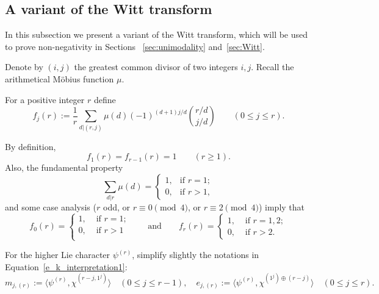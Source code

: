 \subsection{A variant of the Witt transform}
\label{sec:Witt-subsec}
 
In this subsection we present a variant of the Witt transform, which will be used to prove non-negativity in Sections ~\ref{sec:unimodality} and~\ref{sec:Witt}.
    
Denote by $(i,j)$ the greatest common divisor of two integers $i,j$. Recall the arithmetical M\"obius function $\mu$. 
    
\begin{definition}\label{def:f}
    For a positive integer $r$ define 
    \[
        f_j(r) 
        := \frac{1}{r} \sum_{d|(r,j)} \mu(d)(-1)^{(d+1)j/d} \binom{r/d}{j/d} 
	   \qquad (0\le j\le r). 
    \]
\end{definition}
   
\begin{observation}\label{obs:f_values}
    By definition, 
    \[
        f_1(r) = f_{r-1}(r) = 1
        \qquad (r \ge 1).
    \]
    Also, the fundamental property
    \[
        \sum_{d|r} \mu(d) = 
        \begin{cases}
            1, &\text{if } r=1; \\
            0, &\text{if } r>1,
        \end{cases}
    \]
    and some case analysis ($r$ odd, or $r \equiv 0 \pmod 4$, or $r \equiv 2 \pmod 4$) imply that
    \[
        f_0(r) = 
        \begin{cases} 
            1,&\text{ if }  r=1;\\
            0,&\text{ if } r>1\\
        \end{cases}
        \qquad \text{and} \qquad
        f_r(r) = 
        \begin{cases} 
            1,&\text{ if }  r=1,2;\\
            0,&\text{ if } r>2.
        \end{cases}
    \]
\end{observation}
      
For the higher Lie character $\psi^{(r)}$, 
simplify slightly the notations in Equation~\eqref{e_k_interpretation1}:
\[
    m_{j,(r)}
    := \langle \psi^{(r)},\chi^{(r-j,1^j)} \rangle 
    \quad (0 \le j \le r-1), \quad
    e_{j,(r)} 
    :=\langle \psi^{(r)},\chi^{(1^j)\oplus(r-j)} \rangle
    \quad (0 \le j \le r).
\]

